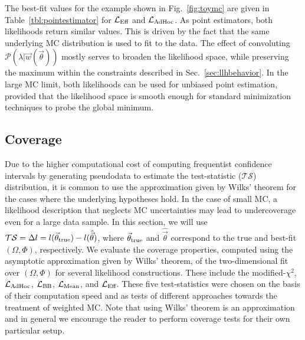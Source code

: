 \documentclass[a4paper, 11pt]{article}
\newcommand{\like}{\mathcal{L}}
\newcommand{\vectheta}{\vec{\theta}}
\newcommand{\vecw}{\vec{w}}
\newcommand{\prob}{\mathcal{P}}
\newcommand{\meanl}{\mathcal{L}_{\textmd{Mean}}}
\newcommand{\mcl}{\like_\textmd{Eff}}
\newcommand{\adhoc}{\mathcal{L}_{\textmd{AdHoc}}}
\newcommand{\lbarlow}{\like_{\textmd{BB}}}
\begin{document}
The best-fit values for the example shown in Fig.~\ref{fig:toymc} are given in Table~\ref{tbl:pointestimator} for $\mcl$ and $\adhoc$. As point estimators, both likelihoods return similar values. This is driven by the fact that the same underlying MC distribution is used to fit to the data. The effect of convoluting $\prob(\lambda|\vecw(\vectheta))$ mostly serves to broaden the likelihood space, while preserving the maximum within the constraints described in Sec.~\ref{sec:llhbehavior}. In the large MC limit, both likelihoods can be used for unbiased point estimation, provided that the likelihood space is smooth enough for standard minimization techniques to probe the global minimum.

\subsection{Coverage}
\label{sec:coverage}
Due to the higher computational cost of computing frequentist confidence intervals by generating pseudodata to estimate the test-statistic ($\mathcal{TS}$) distribution, it is common to use the approximation given by Wilks' theorem for the cases where the underlying hypotheses hold. In the case of small MC, a likelihood description that neglects MC uncertainties may lead to undercoverage even for a large data sample. In this section, we will use  $\mathcal{TS}=\Delta l=l(\vectheta_{\rm true})-l(\hat{\vectheta})$, where $\vectheta_{\rm true}$ and $\hat{\vectheta}$ correspond to the true and best-fit $(\Omega, \Phi)$, respectively. We evaluate the coverage properties, computed using the asymptotic approximation given by Wilks' theorem, of the two-dimensional fit over $(\Omega, \Phi)$ for several likelihood constructions. These include the modified-$\chi^2$, $\adhoc$, $\lbarlow$, $\meanl$, and $\mcl$. These five test-statistics were chosen on the basis of their computation speed and as tests of different approaches towards the treatment of weighted MC. Note that using Wilks' theorem is an approximation and in general we encourage the reader to perform coverage tests for their own particular setup.
\end{document}

